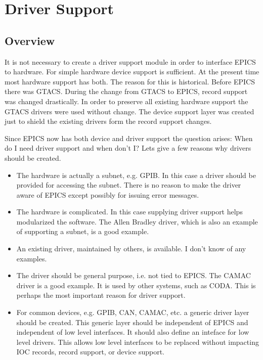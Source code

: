 \chapter{Driver Support}

\section{Overview}

It is not necessary to create a driver support module in order to interface EPICS to hardware. For simple hardware device 
support is sufficient. At the present time most hardware support has both. The reason for this is historical. Before EPICS 
there was GTACS. During the change from GTACS to EPICS, record support was changed drastically. In order to 
preserve all existing hardware support the GTACS drivers were used without change. The device support layer was 
created just to shield the existing drivers form the record support changes.

Since EPICS now has both device and driver support the question arises: When do I need driver support and when don't 
I? Lets give a few reasons why drivers should be created.

\begin{itemize}
\item The hardware is actually a subnet, e.g. GPIB. In this case a driver should be provided for accessing the subnet. 
There is no reason to make the driver aware of EPICS except possibly for issuing error messages.

\item The hardware is complicated. In this case supplying driver support helps modularized the software. The Allen 
Bradley driver, which is also an example of supporting a subnet, is a good example.

\item An existing driver, maintained by others, is available. I don't know of any examples.

\item The driver should be general purpose, i.e. not tied to EPICS. The CAMAC driver is a good example. It is used by 
other systems, such as CODA. This is perhaps the most important reason for driver support.

\item For common devices, e.g. GPIB, CAN, CAMAC, etc. a generic driver layer should be created. This generic layer 
should be independent of EPICS and independent of low level interfaces. It should also define an inteface for low 
level drivers. This allows low level interfaces to be replaced without impacting IOC records, record support, or 
device support.

\end{itemize}

